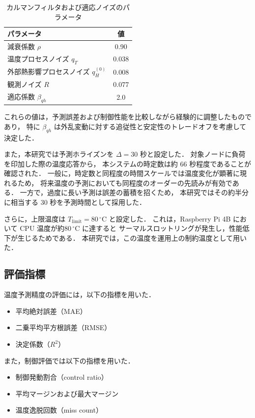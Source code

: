 \documentclass[techrep]{ipsj}
\begin{document}
\begin{table}[tb]
\centering
\caption{カルマンフィルタおよび適応ノイズのパラメータ}
\label{tab:kf_param}
\begin{tabular}{lc}
\hline
パラメータ & 値 \\
\hline
減衰係数 $\rho$ & 0.90 \\
温度プロセスノイズ $q_T$ & 0.038 \\
外部熱影響プロセスノイズ $q_H^{(0)}$ & 0.008 \\
観測ノイズ $R$ & 0.077 \\
適応係数 $\beta_{qh}$ & 2.0 \\
\hline
\end{tabular}
\end{table}

これらの値は，予測誤差および制御性能を比較しながら経験的に調整したものであり，
特に $\beta_{qh}$ は外乱変動に対する追従性と安定性のトレードオフを考慮して決定した．

また，本研究では予測ホライズンを $\Delta=30$ 秒と設定した．
対象ノードに負荷を印加した際の温度応答から，
本システムの時定数は約 66 秒程度であることが確認された．
一般に，時定数と同程度の時間スケールでは温度変化が顕著に現れるため，
将来温度の予測においても同程度のオーダーの先読みが有効である．
一方で，過度に長い予測は誤差の蓄積を招くため，
本研究ではその約半分に相当する 30 秒を予測時間として採用した．

さらに，上限温度は $T_{\mathrm{limit}}=80\,^\circ\mathrm{C}$ と設定した．
これは，Raspberry Pi 4B において CPU 温度が約$ 80\,^\circ\mathrm{C}$ に達すると
サーマルスロットリングが発生し，性能低下が生じるためである．
本研究では，この温度を運用上の制約温度として用いた．
\subsection{評価指標}

温度予測精度の評価には，以下の指標を用いた．

\begin{itemize}
    \item 平均絶対誤差（MAE）
    \item 二乗平均平方根誤差（RMSE）
    \item 決定係数（$R^2$）
\end{itemize}

また，制御評価では以下の指標を用いた．

\begin{itemize}
    \item 制御発動割合（control ratio）
    \item 平均マージンおよび最大マージン
    \item 温度逸脱回数（miss count）
\end{itemize}
\end{document}
